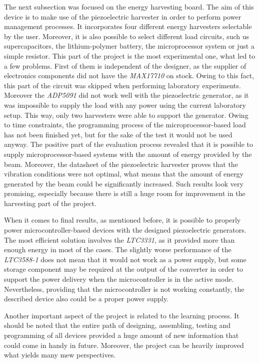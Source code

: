 \documentclass[12pt,a4paper]{article}
\begin{document}
The next subsection was focused on the energy harvesting board. The aim of this device is to make use of the piezoelectric harvester in order to perform power management processes. It incorporates four different energy harvesters selectable by the user. Moreover, it is also possible to select different load circuits, such us supercapacitors, the lithium-polymer battery, the microprocessor system or just a simple resistor. This part of the project is the most experimental one, what led to a few problems. First of them is independent of the designer, as the supplier of electronics components did not have the \textit{MAX17710} on stock. Owing to this fact, this part of the circuit was skipped when performing laboratory experiments. Moreover the \textit{ADP5091} did not work well with the piezoelectric generator, as it was impossible to supply the load with any power using the current laboratory setup. This way, only two harvesters were able to support the generator. Owing to time constraints, the programming process of the microprocessor-based load has not been finished yet, but for the sake of the test it would not be used anyway. The positive part of the evaluation process revealed that it is possible to supply microprocessor-based systems with the amount of energy provided by the beam. Moreover, the datasheet of the piezoelectric harvester \cite{PPA} proves that the vibration conditions were not optimal, what means that the amount of energy generated by the beam could be significantly increased. Such results look very promising, especially because there is still a huge room for improvement in the harvesting part of the project.
\par
When it comes to final results, as mentioned before, it is possible to properly power microcontroller-based devices with the designed piezoelectric generators. The most efficient solution involves the \textit{LTC3331}, as it provided more than enough energy in most of the cases. The slightly worse performance of the \textit{LTC3588-1} does not mean that it would not work as a power supply, but some storage component may be required at the output of the converter in order to support the power delivery when the microcontroller is in the active mode. Nevertheless, providing that the microcontroller is not working constantly, the described device also could be a proper power supply.
\par
Another important aspect of the project is related to the learning process. It should be noted that the entire path of designing, assembling, testing and programming of all devices provided a huge amount of new information that could come in handy in future. Moreover, the project can be heavily improved what yields many mew perspectives.
\end{document}
